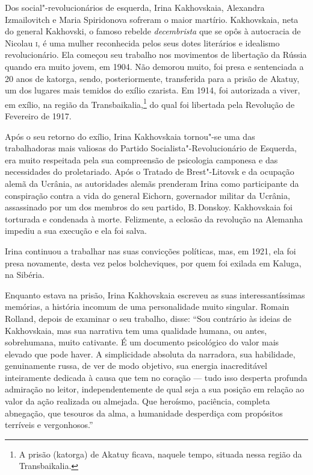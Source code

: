 Dos social"-revolucionários de esquerda, Irina Kakhovskaia,
Alexandra Izmailovitch e Maria Spiridonova sofreram o maior martírio.
Kakhovskaia, neta do general Kakhovski, o famoso rebelde \textit{decembrista}
que se opôs à autocracia de Nicolau \textsc{i}, é uma mulher reconhecida pelos
seus dotes literários e idealismo revolucionário. Ela começou seu
trabalho nos movimentos de libertação da Rússia quando era muito jovem,
em 1904. Não demorou muito, foi presa e sentenciada a 20 anos de
katorga, sendo, posteriormente, transferida para a prisão de Akatuy, um dos lugares
mais temidos do exílio czarista. Em 1914, foi autorizada a viver, em
exílio, na região da Transbaikalia,\footnote{A prisão (katorga) de Akatuy ficava, naquele tempo, situada nessa região da Transbaikalia.} do qual foi libertada pela Revolução
de Fevereiro de 1917.

Após o seu retorno do exílio, Irina Kakhovskaia tornou"-se uma das
trabalhadoras mais valiosas do Partido Socialista"-Revolucionário de
Esquerda, era muito respeitada pela sua compreensão de psicologia
camponesa e das necessidades do proletariado. Após o Tratado de
Brest"-Litovsk e da ocupação alemã da Ucrânia, as autoridades alemãs
prenderam Irina como participante da conspiração contra a vida do
general Eichorn, governador militar da Ucrânia, assassinado por um
dos membros do seu partido, B.\,Donskoy. Kakhovskaia foi torturada e
condenada à morte. Felizmente, a eclosão da revolução na Alemanha
impediu a sua execução e ela foi salva.

Irina continuou a trabalhar nas suas convicções políticas, mas, em 1921,
ela foi presa novamente, desta vez pelos bolcheviques, por quem foi
exilada em Kaluga, na Sibéria.

Enquanto estava na prisão, Irina Kakhovskaia escreveu as suas
interessantíssimas memórias, a história incomum de uma personalidade
muito singular. Romain Rolland, depois de examinar o seu trabalho,
disse: ``Sou contrário às ideias de Kakhovskaia, mas sua narrativa tem
uma qualidade humana, ou antes, sobrehumana, muito cativante. É um
documento psicológico do valor mais elevado que pode haver. A
simplicidade absoluta da narradora, sua habilidade, genuinamente russa,
de ver de modo objetivo, sua energia inacreditável inteiramente dedicada
à causa que tem no coração --- tudo isso desperta profunda admiração no
leitor, independentemente de qual seja a sua posição em relação ao valor
da ação realizada ou almejada. Que heroísmo, paciência, completa
abnegação, que tesouros da alma, a humanidade desperdiça com propósitos
terríveis e vergonhosos.''

